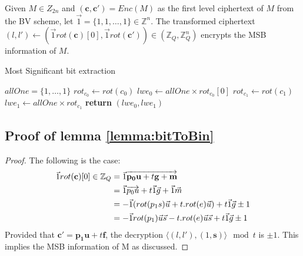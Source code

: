 \begin{lemma}\label{lemma:bitToBin}
	Given $M \in Z_{2n}$ and $(\mathbf{c},\mathbf{c'}) = Enc(M)$ as the first level ciphertext of $M$ from the BV scheme, let $\vec{1} = \{1,1,\dots,1\} \in \mathbb{Z}^n$. The transformed ciphertext $(l, l') \leftarrow (\vec{1}
	rot({\mathbf{c}})[0], \vec{1}
	rot({\mathbf{c'}})) \in (\mathbb{Z}_Q
	, \mathbb{Z}_Q^n)$ encrypts the MSB information of $M$.
\end{lemma}

\begin{algorithm}
  \caption{Most Significant bit extraction}\label{alg:MSBExtract}
  \begin{algorithmic}[1]
    \State $allOne = \{1,\dots,1\}$
    \State $rot_{c_0} \gets rot(c_0)$
    \State $lwe_0 \gets allOne \times rot_{c_0}[0]$
    \State $rot_{c_1} \gets rot(c_1)$
    \State $lwe_1 \gets allOne \times rot_{c_1}$
    \State \textbf{return} $(lwe_0,lwe_1)$
    \EndProcedure
  \end{algorithmic}
\end{algorithm}


\subsection{Proof of lemma \ref{lemma:bitToBin}}
\label{append:proofHom}
 \begin{proof}
	The following is the case:\\
	\begin{align*}
	\vec{1}rot(\mathbf{c})[0] \in \mathbb{Z}_Q &= \vec{1}\overrightarrow{
		\mathbf{p_0}\mathbf{u} + t\mathbf{g} + \mathbf{m}}\\
	&= \vec{1}\overrightarrow{p_0u} +t\vec{1}\vec{g} +\vec{1}\vec{m}\\
	&= -\vec{1}(rot(p_1s)\vec{u} +t.rot(e)\vec{u}) + t\vec{1}\vec{g} \pm1\\
	&= -\vec{1}rot(p_1)\vec{u}\vec{s} - t.rot(e)\vec{u}\vec{s} + t\vec{1}\vec{g} \pm1\\
	\end{align*}
	Provided that $\mathbf{c'} = \mathbf{p_1}\mathbf{u} + t\mathbf{f}$, the decryption $\langle(l,l'),(1,\mathbf{s})\rangle \mod t$ is $\pm1$.
	This implies the MSB information of M as discussed.
\end{proof}

